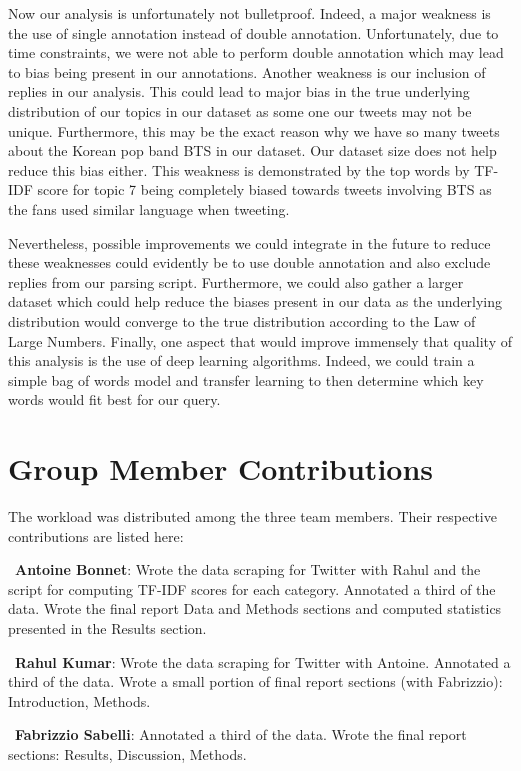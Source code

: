 \documentclass[letterpaper]{article} %
\begin{document}
Now our analysis is unfortunately not bulletproof. Indeed, a major weakness is the use of single annotation instead of double annotation. Unfortunately, due to time constraints, we were not able to perform double annotation which may lead to bias being present in our annotations. Another weakness is our inclusion of replies in our analysis. This could lead to major bias in the true underlying distribution of our topics in our dataset as some one our tweets may not be unique. Furthermore, this may be the exact reason why we have so many tweets about the Korean pop band BTS in our dataset. Our dataset size does not help reduce this bias either. This weakness is demonstrated by the top words by TF-IDF score for topic 7 being completely biased towards tweets involving BTS as the fans used similar language when tweeting.

Nevertheless, possible improvements we could integrate in the future to reduce these weaknesses could evidently be to use double annotation and also exclude replies from our parsing script. Furthermore, we could also gather a larger dataset which could help reduce the biases present in our data as the underlying distribution would converge to the true distribution according to the Law of Large Numbers. Finally, one aspect that would improve immensely that quality of this analysis is the use of deep learning algorithms. Indeed, we could train a simple bag of words model and transfer learning to then determine which key words would fit best for our query.



\section{Group Member Contributions}

The workload was distributed among the three team members. Their respective contributions are listed here: 

\  \textbf{Antoine Bonnet}: Wrote the data scraping for Twitter with Rahul and the script for computing TF-IDF scores for each category. Annotated a third of the data. Wrote the final report Data and Methods sections and computed statistics presented in the Results section.

\  \textbf{Rahul Kumar}: Wrote the data scraping for Twitter with Antoine.
Annotated a third of the data. Wrote a small portion of final report sections
(with Fabrizzio):  Introduction, Methods.

\  \textbf{Fabrizzio Sabelli}: Annotated a third of the data. Wrote the final report sections: Results, Discussion, Methods.
  
  
{}
\end{document}
